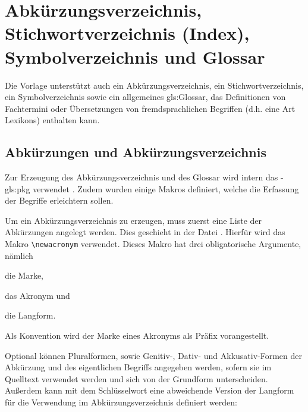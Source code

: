 \section{Abkürzungsverzeichnis, Stichwortverzeichnis (Index), Symbolverzeichnis und Glossar}%
%
%
%
%
\label{sec:Glossare}
%
Die Vorlage unterstützt auch ein Abkürzungsverzeichnis, ein Stichwortverzeichnis,
ein Symbolverzeichnis sowie ein allgemeines \gls{gls:Glossar},
das Definitionen von Fachtermini oder
Übersetzungen von fremdsprachlichen Begriffen
(d.h. eine Art Lexikons) enthalten kann.


\subsection{Abkürzungen und Abkürzungsverzeichnis}%
%
%
\label{sec:Akronyme}
Zur Erzeugung des Abkürzungsverzeichnis und des Glossar wird intern das
-\gls{gls:pkg} verwendet \cite{talbot2014}.
Zudem wurden einige Makros definiert, welche die Erfassung der Begriffe erleichtern sollen.

Um ein Abkürzungsverzeichnis zu erzeugen, muss zuerst eine Liste der Abkürzungen angelegt werden.
Dies geschieht in der Datei .
Hierfür wird das Makro \lstinline|\newacronym| verwendet.
Dieses Makro hat drei obligatorische Argumente, nämlich
\begin{itemize*}
\item die Marke,
\item das Akronym und
\item die Langform.
\end{itemize*}

Als Konvention wird der Marke eines Akronyms  als Präfix vorangestellt.

\begin{latex}[caption={Definition einer Abkürzung},label={lst:SimpleAcronymEntry}]
\end{latex}

Optional können Pluralformen, sowie Genitiv-, Dativ- und Akkusativ-Formen 
der Abkürzung und des eigentlichen Begriffs angegeben werden,
sofern sie im Quelltext verwendet werden und sich von der Grundform unterscheiden.
Außerdem kann mit dem Schlüsselwort 
eine abweichende Version der Langform für die Verwendung im Abkürzungsverzeichnis definiert werden:

